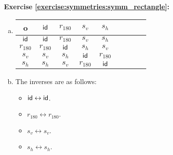 \noindent\textbf{Exercise \ref{exercise:symmetries:symm_rectangle}:}\\ 
\begin{enumerate}[(a)]
\item
\begin{tabular}{c| c c c c c c c c }
		o & $\sf{id}$ & $r_{180}$ & $s_v$ & $s_h$ \\
		\hline
		$\sf{id}$ & $\sf{id}$ & $r_{180}$ & $s_v$ & $s_h$\\
		$r_{180}$ & $r_{180}$ & $\sf{id}$ & $s_h$ & $s_v$\\
		$s_v$ & $s_v$ & $s_h$ & $\sf{id}$ & $r_{180}$\\
		$s_h$ & $s_h$ & $s_v$ & $r_{180}$ & $\sf{id}$\\
	\end{tabular}
	
\item
The inverses are as follows:
	\begin{multicols}{2}
	\begin{itemize}
	\item
	$\sf{id} \leftrightarrow \sf{id}$.
	
	\item
	$r_{180} \leftrightarrow r_{180}$.
	
	\item
	$s_v \leftrightarrow s_v$.
	
	\item
	$s_h \leftrightarrow s_h$.
	\end{itemize}
	\end{multicols}
\end{enumerate}

